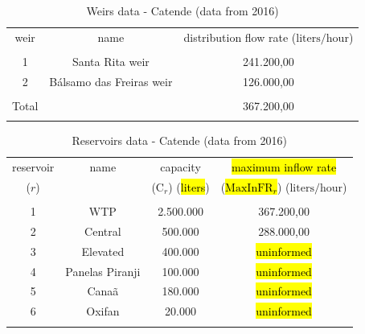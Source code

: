 \documentclass{singlecol}
\theoremstyle{TH}{
\newtheorem{lemma}{Lemma}
\newtheorem{theorem}[lemma]{Theorem}
\newtheorem{corrolary}[lemma]{Corrolary}
\newtheorem{conjecture}[lemma]{Conjecture}
\newtheorem{proposition}[lemma]{Proposition}
\newtheorem{claim}[lemma]{Claim}
\newtheorem{stheorem}[lemma]{Wrong Theorem}
\newtheorem{algorithm}{Algorithm}
}
\theoremstyle{THrm}{
\newtheorem{definition}{Definition}[section]
\newtheorem{question}{Question}[section]
\newtheorem{remark}{Remark}
\newtheorem{scheme}{Scheme}
}
\theoremstyle{THhit}{
\newtheorem{case}{Case}[section]
}
\begin{document}
\begin{table}[H]
\begin{center}
	\begin{tabular}{ c  c  c } 
		weir      & name        & distribution flow rate  ($\mathrm{liters/hour}$)     \\
		                                                                    \\
		1              & Santa Rita weir            & 241.200,00          \\
		2              & Bálsamo das Freiras  weir  & 126.000,00         \\
							                                                \\
		\hline
		Total          &                               & 367.200,00         \\
		\\
	\end{tabular}
\caption{Weirs data - Catende (data from 2016)}
\label{tab:weirsCatende}
\end{center}
\end{table}

\begin{table}[H]
\begin{center}
	\begin{tabular}{ c  c  c  c } 
		reservoir      & name              & capacity                       & \hl{maximum inflow rate}    \\
		($r$)          &             	   &  ($\mathrm{C}_{r}$) (\hl{liters})    &  (\hl{$\mathrm{MaxInFR}_{r}$}) ($\mathrm{liters/hour}$) \\
		\\
		1              & WTP               & 2.500.000            &  367.200,00   \\
		2              & Central           &   500.000 		&  288.000,00   \\
		3              & Elevated          &   400.000            & \hl{uninformed} \\
		4              & Panelas Piranji   &   100.000            & \hl{uninformed} \\
		5              & Canaã             &   180.000            & \hl{uninformed} \\
		6              & Oxifan            &    20.000            & \hl{uninformed} \\
		\\
	\end{tabular}
\caption{Reservoirs data - Catende (data from 2016)}
\label{tab:reservoirsCatende}
\end{center}
\end{table}
\end{document}
